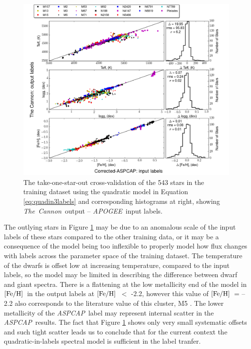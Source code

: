 \documentclass[12pt, preprint]{aastex}
\newcommand{\feh}{\mbox{$\rm [Fe/H]$}}
\newcommand{\tc}{\textsl{The~Cannon}}
\newcommand{\apogee}{\textsl{APOGEE}}
\newcommand{\aspcap}{\textsl{ASPCAP}}
\begin{document}
\begin{figure}[h!]
\centering
    \includegraphics[scale=0.45]{./plots/takeout_histc.png}
\caption{The take-one-star-out cross-validation of the 543 stars in the training dataset using the quadratic model in Equation  \ref{eq:quadin3labels} and corresponding histograms at right, showing \tc\ output -- \apogee\ input labels.}
\label{fig:takeonestarout}
\end{figure}

The outlying stars in Figure \ref{fig:takeonestarout} may be due to an anomalous scale of the input labels of these stars compared to the other training data, or it may be a consequence of the model being too inflexible to properly model how flux changes with labels across the parameter space of the training dataset. 
The temperature of the dwarfs is offset low at increasing temperature, compared to the input labels, so the model may be limited in describing the difference between dwarf and giant spectra. 
There is a flattening at the low metallicity end of the model in \feh\ in the output labels at \feh\ $<$ -2.2, however this value of \feh\ = --2.2 also corresponds to the literature value of this cluster, M5 \citep{Meszaros2013}. 
The lower metallicity of the \aspcap\ label may represent internal scatter in the \aspcap\ results.
The fact that Figure \ref{fig:takeonestarout} shows only very small systematic offsets and such tight scatter leads us to conclude that for the
current context the quadratic-in-labels spectral model is sufficient in the label tranfer. 
\end{document}
